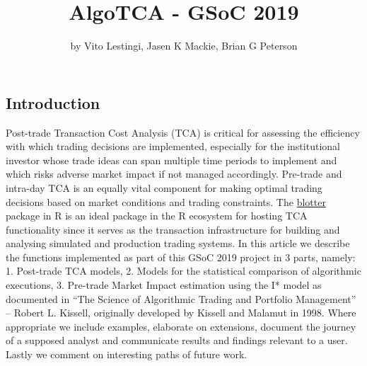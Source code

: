 \title{AlgoTCA - GSoC 2019}
\author{by Vito Lestingi, Jasen K Mackie, Brian G Peterson}

\maketitle



\hypertarget{introduction}{%
\subsection{Introduction}\label{introduction}}

Post-trade Transaction Cost Analysis (TCA) is critical for assessing the
efficiency with which trading decisions are implemented, especially for
the institutional investor whose trade ideas can span multiple time
periods to implement and which risks adverse market impact if not
managed accordingly. Pre-trade and intra-day TCA is an equally vital
component for making optimal trading decisions based on market
conditions and trading constraints. The
\href{https://github.com/braverock/blotter}{blotter} package in R is an
ideal package in the R ecosystem for hosting TCA functionality since it
serves as the transaction infrastructure for building and analysing
simulated and production trading systems. In this article we describe
the functions implemented as part of this GSoC 2019 project in 3 parts,
namely: 1. Post-trade TCA models, 2. Models for the statistical
comparison of algorithmic executions, 3. Pre-trade Market Impact
estimation using the I* model as documented in ``The Science of
Algorithmic Trading and Portfolio Management'' -- Robert L. Kissell,
originally developed by Kissell and Malamut in 1998. Where appropriate
we include examples, elaborate on extensions, document the journey of a
supposed analyst and communicate results and findings relevant to a
user. Lastly we comment on interesting paths of future work.


